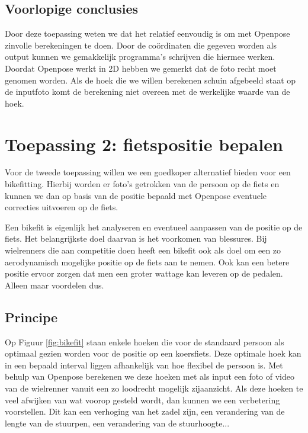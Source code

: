 \documentclass[a4paper,twoside,kulak]{kulakreport}
\begin{document}
\subsection{Voorlopige conclusies}
Door deze  toepassing weten we dat het relatief eenvoudig is om met Openpose zinvolle berekeningen te doen. Door de coördinaten die gegeven worden als output kunnen we gemakkelijk programma's schrijven die hiermee werken. Doordat Openpose werkt in 2D hebben we gemerkt dat de foto recht moet genomen worden. Als de hoek die we willen berekenen schuin afgebeeld staat op de inputfoto komt de berekening niet overeen met de werkelijke waarde van de hoek.


\section{Toepassing 2: fietspositie bepalen}
Voor de tweede toepassing willen we een goedkoper alternatief bieden voor een bikefitting. Hierbij worden er foto's getrokken van de persoon op de fiets en kunnen we dan op basis van de positie bepaald met Openpose eventuele correcties uitvoeren op de fiets.

Een bikefit is eigenlijk het analyseren en eventueel aanpassen van de positie op de fiets. Het belangrijkste doel daarvan is het voorkomen van blessures. Bij wielrenners die aan competitie doen heeft een bikefit ook als doel om een zo aerodynamisch mogelijke positie op de fiets aan te nemen. Ook kan een betere positie ervoor zorgen dat men een groter wattage kan leveren op de pedalen. Alleen maar voordelen dus.

\subsection{Principe}

Op Figuur \ref{fig:bikefit} staan enkele hoeken die voor de standaard persoon als optimaal gezien worden voor de positie op een koersfiets. Deze optimale hoek kan in een bepaald interval liggen afhankelijk van hoe flexibel de persoon is. Met behulp van Openpose berekenen we deze hoeken met als input een foto of video van de wielrenner vanuit een zo loodrecht mogelijk zijaanzicht. Als deze hoeken te veel afwijken van wat voorop gesteld wordt, dan kunnen we een verbetering voorstellen. Dit kan een verhoging van het zadel zijn, een verandering van de lengte van de stuurpen, een verandering van de stuurhoogte... 
\end{document}
